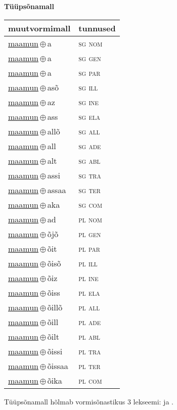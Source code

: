 

\vspace{3.5em}
\noindent \begin{minipage}{\textwidth}
\noindent \textbf{Tüüpsõnamall \,}\\

\begin{sideways}
\begin{tabular}{l l}
muutvormimall & tunnused \\
\hline
\underline{maamun}\,$\oplus$\,a & \textsc{ sg nom } \\
\underline{maamun}\,$\oplus$\,a & \textsc{ sg gen } \\
\underline{maamun}\,$\oplus$\,a & \textsc{ sg par } \\
\underline{maamun}\,$\oplus$\,asõ & \textsc{ sg ill } \\
\underline{maamun}\,$\oplus$\,az & \textsc{ sg ine } \\
\underline{maamun}\,$\oplus$\,ass & \textsc{ sg ela } \\
\underline{maamun}\,$\oplus$\,allõ & \textsc{ sg all } \\
\underline{maamun}\,$\oplus$\,all & \textsc{ sg ade } \\
\underline{maamun}\,$\oplus$\,alt & \textsc{ sg abl } \\
\underline{maamun}\,$\oplus$\,assi & \textsc{ sg tra } \\
\underline{maamun}\,$\oplus$\,assaa & \textsc{ sg ter } \\
\underline{maamun}\,$\oplus$\,aka & \textsc{ sg com } \\
\underline{maamun}\,$\oplus$\,ad & \textsc{ pl nom } \\
\underline{maamun}\,$\oplus$\,õjõ & \textsc{ pl gen } \\
\underline{maamun}\,$\oplus$\,õit & \textsc{ pl par } \\
\underline{maamun}\,$\oplus$\,õisõ & \textsc{ pl ill } \\
\underline{maamun}\,$\oplus$\,õiz & \textsc{ pl ine } \\
\underline{maamun}\,$\oplus$\,õiss & \textsc{ pl ela } \\
\underline{maamun}\,$\oplus$\,õillõ & \textsc{ pl all } \\
\underline{maamun}\,$\oplus$\,õill & \textsc{ pl ade } \\
\underline{maamun}\,$\oplus$\,õilt & \textsc{ pl abl } \\
\underline{maamun}\,$\oplus$\,õissi & \textsc{ pl tra } \\
\underline{maamun}\,$\oplus$\,õissaa & \textsc{ pl ter } \\
\underline{maamun}\,$\oplus$\,õika & \textsc{ pl com } \\
\end{tabular}
\end{sideways}
\label{tab:tüüpsõnamall-maamuna}

\end{minipage}

 
\vspace{1em}
\noindent Tüüpsõnamall  hõlmab vormisõnastikus 3 lekseemi:  ja .
